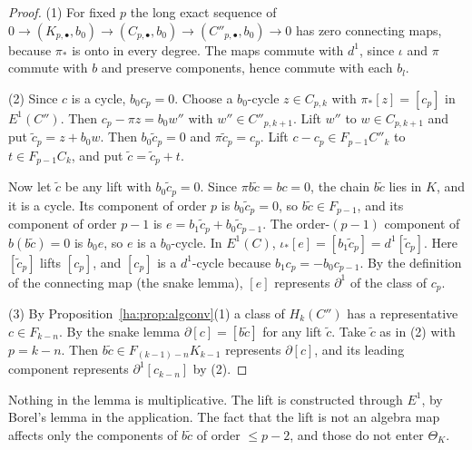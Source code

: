 \begin{proof}
(1) For fixed \(p\) the long exact sequence of
\(0\to(K_{p,\bullet},b_0)\to(C_{p,\bullet},b_0)\to(C''_{p,\bullet},b_0)\to0\)
has zero connecting maps, because \(\pi_*\) is onto in every degree. The
maps commute with \(d^1\), since \(\iota\) and \(\pi\) commute with \(b\)
and preserve components, hence commute with each \(b_l\).

(2) Since \(c\) is a cycle, \(b_0c_p=0\). Choose a \(b_0\)-cycle \(z\in
C_{p,k}\) with \(\pi_*[z]=[c_p]\) in \(E^1(C'')\). Then \(c_p-\pi z=b_0w''\)
with \(w''\in C''_{p,k+1}\). Lift \(w''\) to \(w\in C_{p,k+1}\) and put
\(\tilde c_p=z+b_0w\). Then \(b_0\tilde c_p=0\) and \(\pi\tilde c_p=c_p\).
Lift \(c-c_p\in F_{p-1}C''_k\) to \(t\in F_{p-1}C_k\), and put
\(\tilde c=\tilde c_p+t\).

Now let \(\tilde c\) be any lift with \(b_0\tilde c_p=0\). Since
\(\pi b\tilde c=bc=0\), the chain \(b\tilde c\) lies in \(K\), and it is a
cycle. Its component of order \(p\) is \(b_0\tilde c_p=0\), so \(b\tilde
c\in F_{p-1}\), and its component of order \(p-1\) is
\(e=b_1\tilde c_p+b_0\tilde c_{p-1}\). The order-\((p-1)\) component of
\(b(b\tilde c)=0\) is \(b_0e\), so \(e\) is a \(b_0\)-cycle. In
\(E^1(C)\), \(\iota_*[e]=[b_1\tilde c_p]=d^1[\tilde c_p]\). Here
\([\tilde c_p]\) lifts \([c_p]\), and \([c_p]\) is a \(d^1\)-cycle because
\(b_1c_p=-b_0c_{p-1}\). By the definition of the connecting map (the snake
lemma), \([e]\) represents \(\partial^1\) of the class of \(c_p\).

(3) By Proposition~\ref{ha:prop:algconv}(1) a class of \(H_k(C'')\) has a
representative \(c\in F_{k-n}\). By the snake lemma \(\partial[c]=[b\tilde
c]\) for any lift \(\tilde c\). Take \(\tilde c\) as in (2) with \(p=k-n\).
Then \(b\tilde c\in F_{(k-1)-n}K_{k-1}\) represents \(\partial[c]\), and
its leading component represents \(\partial^1[c_{k-n}]\) by (2).
\end{proof}

Nothing in the lemma is multiplicative. The lift is constructed through
\(E^1\), by Borel's lemma in the application. The fact that the lift is
not an algebra map affects only the components of \(b\tilde c\) of
order \(\le p-2\), and those do not enter \(\Theta_K\).

